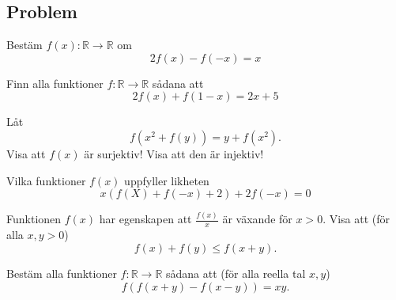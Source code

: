 \subsection{Problem}
\begin{problem}
	Bestäm \(f(x) : \mathbb{R} \rightarrow \mathbb{R} \) om
	\[
		2f(x) - f(-x) = x
	\]
\end{problem}
\begin{problem}
	Finn alla funktioner \(f: \mathbb{R} \rightarrow \mathbb{R} \) sådana att
	\[
		2 f(x) + f(1-x) = 2x + 5
	\]
\end{problem}


\begin{problem}
	Låt 
	\[
		f(x^2+ f(y)) = y + f(x^2).
	\]
	Visa att \(f(x)\) är surjektiv! Visa att den är injektiv!
\end{problem}


\begin{problem}
	Vilka funktioner \(f(x)\) uppfyller likheten
	\[
		x(f(X) + f(-x) + 2) + 2f(-x) = 0
	\]
\end{problem}

\begin{problem}
	Funktionen \(f(x)\) har egenskapen att \(\frac{f(x)}{x} \) är växande för \(x>0\). Visa att (för alla \(x, y > 0\))
	\[
		f(x) + f(y) \leq f(x+y).
	\]
\end{problem}

\begin{problem}
	Bestäm alla funktioner \(f: \mathbb{R} \rightarrow \mathbb{R} \) sådana att (för alla reella tal \(x, y\))
	\[
		f(f(x+y) - f(x-y)) = xy.
	\]
\end{problem}
